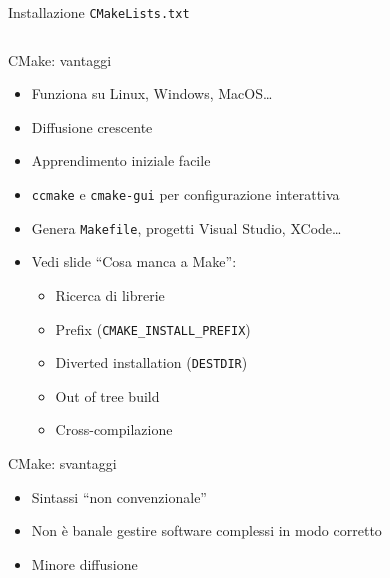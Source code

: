 \documentclass[xetex,table]{beamer}
\begin{document}
\begin{frame}{Installazione}
  \texttt{CMakeLists.txt}
  \inputminted[bgcolor=codebackground,frame=single]{cmake}{examples/4-cmake-2/CMakeLists.txt}
\end{frame}

\begin{frame}{CMake: vantaggi}
  \begin{itemize}

  \item Funziona su Linux, Windows, MacOS\dots
  \item Diffusione crescente
  \item Apprendimento iniziale facile
  \item \texttt{ccmake} e \texttt{cmake-gui} per configurazione interattiva
  \item Genera \texttt{Makefile}, progetti Visual Studio, XCode\dots

  \item Vedi slide ``Cosa manca a Make'':
    \begin{itemize}
    \item Ricerca di librerie
    \item Prefix (\texttt{CMAKE\_INSTALL\_PREFIX})
    \item Diverted installation (\texttt{DESTDIR})
    \item Out of tree build
    \item Cross-compilazione
    \end{itemize}

  \end{itemize}
\end{frame}

\begin{frame}{CMake: svantaggi}
  \begin{itemize}
  \item Sintassi ``non convenzionale''
  \item Non è banale gestire software complessi in modo corretto
  \item Minore diffusione
  \end{itemize}
\end{frame}
\end{document}
